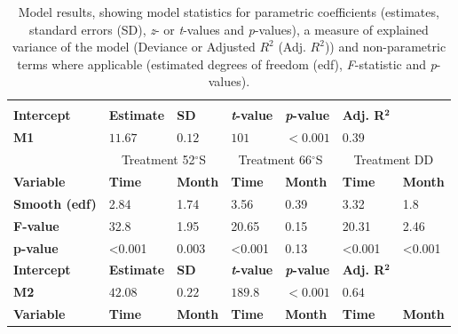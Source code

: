 \begin{table}[]
\centering
{\scriptsize
\caption{Model results, showing model statistics for parametric coefficients (estimates, standard errors (SD), \textit{z}- or \textit{t}-values and \textit{p}-values), a measure of explained variance of the model (Deviance or Adjusted $R^{2}$ (Adj. $R^{2}$)) and non-parametric terms where applicable (estimated degrees of freedom (edf), \textit{F}-statistic and \textit{p}-values). }
\label{Tab2_2}
\begin{tabular}{@{}lllllll@{}}
\toprule \\
\textbf{Intercept} & \textbf{Estimate} & \textbf{SD} & \textbf{\textit{t}-value} & \textbf{\textit{p}-value} & \textbf{Adj. R}$\mathbf{^{2}}$ & \\
\textbf{M1} & $11.67$ & $0.12$ & $101$ & $<0.001$ & $0.39$ & \\
\midrule
& \multicolumn{2}{c}{Treatment 52$^{\circ}$S} & \multicolumn{2}{c}{Treatment 66$^{\circ}$S} & \multicolumn{2}{c}{Treatment DD} \\
\textbf{Variable} & \cellcolor{gray!50}\textbf{Time} & \cellcolor{gray!50}\textbf{Month} &\cellcolor{blue!25}\textbf{Time} & \cellcolor{blue!25}\textbf{Month} & \cellcolor{blue!50}\textbf{Time} & \cellcolor{blue!50}\textbf{Month} \\

\textbf{Smooth (edf)} & \cellcolor{gray!50}2.84 & \cellcolor{gray!50}1.74 &\cellcolor{blue!25}3.56 & \cellcolor{blue!25}0.39 & \cellcolor{blue!50}3.32 & \cellcolor{blue!50}1.8 \\

\textbf{F-value} & \cellcolor{gray!50}32.8 & \cellcolor{gray!50}1.95 &\cellcolor{blue!25}20.65 & \cellcolor{blue!25}0.15 & \cellcolor{blue!50}20.31 & \cellcolor{blue!50}2.46 \\

\textbf{p-value} & \cellcolor{gray!50}<0.001 & \cellcolor{gray!50}0.003 &\cellcolor{blue!25}<0.001 & \cellcolor{blue!25}0.13 & \cellcolor{blue!50}<0.001 & \cellcolor{blue!50}<0.001 \\

\midrule
\textbf{Intercept} & \textbf{Estimate} & \textbf{SD} & \textbf{\textit{t}-value} & \textbf{\textit{p}-value} & \textbf{Adj. R}$\mathbf{^{2}}$ & \\
\textbf{M2} & $42.08$ & $0.22$ & $189.8$ & $<0.001$ & $0.64$ & \\
\midrule

\textbf{Variable} & \cellcolor{gray!50}\textbf{Time} & \cellcolor{gray!50}\textbf{Month} &\cellcolor{blue!25}\textbf{Time} & \cellcolor{blue!25}\textbf{Month} & \cellcolor{blue!50}\textbf{Time} & \cellcolor{blue!50}\textbf{Month} \\


\end{tabular}}
\end{table}
